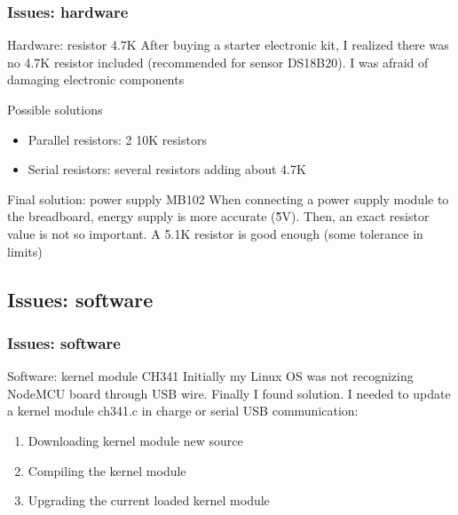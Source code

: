 \documentclass[
    aspectratio=169,                   %
]{beamer}
\begin{document}
    \begin{frame}
        \frametitle{Issues: hardware}

        \begin{block}{Hardware: resistor 4.7K}
            After buying a starter electronic kit, I realized there was no 4.7K resistor included (recommended\cite{resistor} for sensor DS18B20). I was afraid of damaging electronic components
        \end{block}

        \begin{block}{Possible solutions}
            \begin{itemize}
                \item \alert{Parallel resistors}: 2 10K resistors
                \item \alert{Serial resistors}: several resistors adding about 4.7K
            \end{itemize}
        \end{block}

        \begin{block}{Final solution: power supply MB102}
            When connecting a power supply module to the breadboard, energy supply is more accurate (\~5V). Then, an exact resistor value is not so important. A 5.1K resistor is good enough (some tolerance in limits)
        \end{block}

    \end{frame}

\subsection{Issues: software}

    \begin{frame}
        \frametitle{Issues: software}

        \begin{block}{Software: kernel module CH341}
            Initially my Linux OS was not recognizing NodeMCU board through USB wire. Finally I found solution.\cite{ch341} I needed to update a kernel module \alert{ch341.c} in charge or serial USB communication:
            \begin{enumerate}
                \item Downloading kernel module new source
                \item Compiling the kernel module
                \item Upgrading the current loaded kernel module
            \end{enumerate}
        \end{block}


    \end{frame}
\end{document}

